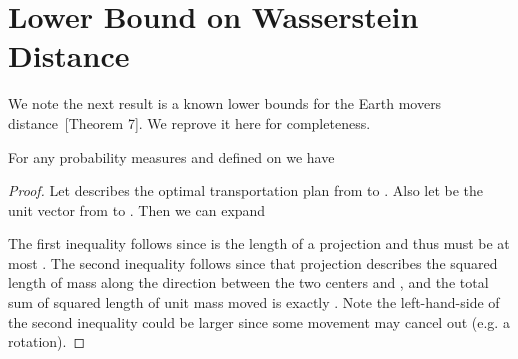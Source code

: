 \documentclass[11pt]{myclass}
\begin{document}
\section{Lower Bound on Wasserstein Distance}
\label{app:stability}

We note the next result is a known lower bounds for the Earth movers distance~\cite{Coh99}[Theorem 7].  We reprove it here for completeness.  

\begin{lemma}
For any probability measures  and  defined on  we have

\end{lemma}
\begin{proof}
Let  describes the optimal transportation plan from  to .  Also let  be the unit vector from  to .   Then we can expand 

The first inequality follows since  is the length of a projection and thus must be at most .  
The second inequality follows since that projection describes the squared length of mass  along the direction between the two centers  and , and the total sum of squared length of unit mass moved is exactly .  Note the left-hand-side of the second inequality could be larger since some movement may cancel out (e.g. a rotation).  
\end{proof}
\end{document}
